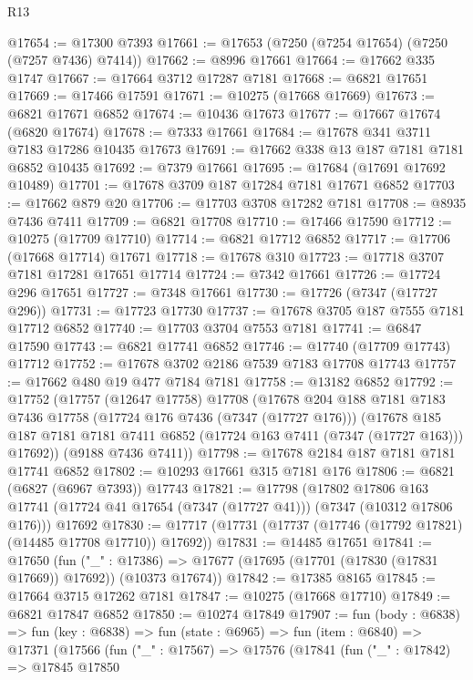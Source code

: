 \begin{lexlean}{R13}
\begin{coremodule}
@17654 := @17300 @7393
@17661 := @17653 (@7250 (@7254 @17654) (@7250 (@7257 @7436) @7414))
@17662 := @8996 @17661
@17664 := @17662 @335 @1747
@17667 := @17664 @3712 @17287 @7181
@17668 := @6821 @17651
@17669 := @17466 @17591
@17671 := @10275 (@17668 @17669)
@17673 := @6821 @17671 @6852
@17674 := @10436 @17673
@17677 := @17667 @17674 (@6820 @17674)
@17678 := @7333 @17661
@17684 := @17678 @341 @3711 @7183 @17286 @10435 @17673
@17691 := @17662 @338 @13 @187 @7181 @7181 @6852 @10435
@17692 := @7379 @17661
@17695 := @17684 (@17691 @17692 @10489)
@17701 := @17678 @3709 @187 @17284 @7181 @17671 @6852
@17703 := @17662 @879 @20
@17706 := @17703 @3708 @17282 @7181
@17708 := @8935 @7436 @7411
@17709 := @6821 @17708
@17710 := @17466 @17590
@17712 := @10275 (@17709 @17710)
@17714 := @6821 @17712 @6852
@17717 := @17706 (@17668 @17714) @17671
@17718 := @17678 @310
@17723 := @17718 @3707 @7181 @17281 @17651 @17714
@17724 := @7342 @17661
@17726 := @17724 @296 @17651
@17727 := @7348 @17661
@17730 := @17726 (@7347 (@17727 @296))
@17731 := @17723 @17730
@17737 := @17678 @3705 @187 @7555 @7181 @17712 @6852
@17740 := @17703 @3704 @7553 @7181
@17741 := @6847 @17590
@17743 := @6821 @17741 @6852
@17746 := @17740 (@17709 @17743) @17712
@17752 := @17678 @3702 @2186 @7539 @7183 @17708 @17743
@17757 := @17662 @480 @19 @477 @7184 @7181
@17758 := @13182 @6852
@17792 := @17752
    (@17757
      (@12647 @17758)
      @17708
      (@17678
        @204
        @188
        @7181
        @7183
        @7436
        @17758
        (@17724 @176 @7436 (@7347 (@17727 @176)))
        (@17678 @185 @187 @7181 @7181 @7411 @6852 (@17724 @163 @7411 (@7347 (@17727 @163))) @17692))
      (@9188 @7436 @7411))
@17798 := @17678 @2184 @187 @7181 @7181 @17741 @6852
@17802 := @10293 @17661 @315 @7181 @176
@17806 := @6821 (@6827 (@6967 @7393)) @17743
@17821 := @17798
    (@17802
      @17806
      @163
      @17741
      (@17724 @41 @17654 (@7347 (@17727 @41)))
      (@7347 (@10312 @17806 @176)))
    @17692
@17830 := @17717 (@17731 (@17737 (@17746 (@17792 @17821) (@14485 @17708 @17710)) @17692))
@17831 := @14485 @17651
@17841 := @17650
    (fun ("_" : @17386) => @17677 (@17695 (@17701 (@17830 (@17831 @17669)) @17692)) (@10373 @17674))
@17842 := @17385 @8165
@17845 := @17664 @3715 @17262 @7181
@17847 := @10275 (@17668 @17710)
@17849 := @6821 @17847 @6852
@17850 := @10274 @17849
@17907 := fun (body : @6838) =>
  fun (key : @6838) =>
  fun (state : @6965) =>
  fun (item : @6840) =>
  @17371
    (@17566
      (fun ("_" : @17567) =>
      @17576
        (@17841
          (fun ("_" : @17842) =>
          @17845
            @17850

\end{coremodule}
\end{lexlean}
